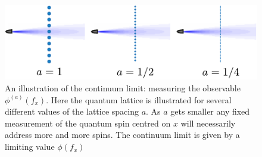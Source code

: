 \documentclass[prl,twocolumn,lengthcheck,superscriptaddress]{revtex4-1}
\theoremstyle{definition}
\theoremstyle{remark}
\begin{document}

\begin{figure}
\includegraphics{decreasea.pdf}
\caption{An illustration of the continuum limit: measuring the observable $\phi^{(a)}( f_x)$. Here the quantum lattice is illustrated for several different values of the lattice spacing $a$. As $a$ gets smaller any fixed measurement of the quantum spin centred on $x$ will necessarily address more and more spins. The continuum limit is given by a limiting value $\phi(f_x)$}
\end{figure}
\end{document}
